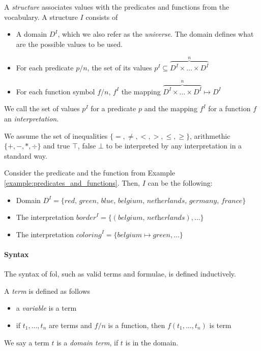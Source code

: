 A \textit{structure} associates values with the predicates and functions from the vocabulary. A structure $I$ consists of

\begin{itemize}
  \item A domain $D^I$, which we also refer as the \textit{universe}. The domain defines what are the possible values to be used.
  \item For each predicate $p/n$, the set of its values $p^I \subseteq \overbrace{D^I \times \dots \times D^I}^{n}$
  \item For each function symbol $f/n$,  $f^I$ the mapping  $\overbrace{D^I \times \dots \times D^I}^{n} \mapsto D^I$
\end{itemize}
We call the set of values $p^I$ for a predicate $p$  and the mapping $f^I$ for a function $f$ an \textit{interpretation}.

We assume the set of inequalities $\{ =, \neq, <, >, \leq, \geq \}$,  arithmethic $\{+, -, *, \div \}$ and true $\top$, false $\bot$ to be interpreted by any interpretation in a standard way.

\begin{example}
  Consider the predicate and the function from Example \ref{example:predicates_and_functions}. Then, $I$ can be the following:
  \begin{itemize}
    \item Domain $D^I = \{ \textit{red, green, blue, belgium, netherlands, germany, france} \}$
    \item The interpretation $\textit{border}^I = \{ (\textit{belgium, netherlands}), \dots \}$                                                                                     
    \item The interpretation $\textit{coloring}^I = \{ \textit{belgium} \mapsto \textit{green}, \dots \}$                                                                                     
  \end{itemize}
\end{example}


\paragraph{Syntax} 

The syntax of \acrlong{fol}, such as valid terms and formulae, is defined inductively.

A \textit{term} is defined as follows  
\begin{itemize}
  \item a \textit{variable} is a term
  \item if $t_1,\dots,t_n$ are terms and $f/n$ is a function, then $f(t_1,\dots,t_n)$ is term
\end{itemize}
We say a term $t$ is a \textit{domain term}, if $t$ is in the domain.


